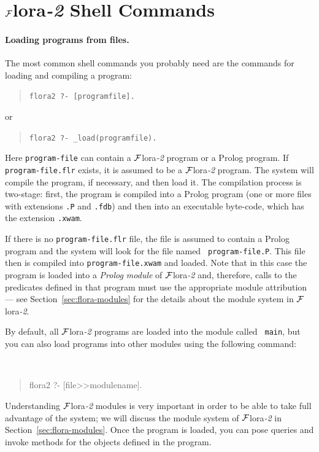 \documentclass[11pt]{article}
\newcommand{\FLORA}{{\mbox{\sc ${\cal F}${lora}\rm\emph{-2}}}\xspace}
\newcommand{\ofile}{xwam}
\begin{document}
\section{\FLORA Shell Commands} \label{sec-shell-commands}

\paragraph{Loading programs from files.}
The most common shell commands you probably need are the commands for
loading and compiling a program:
\begin{quote}
  {\tt flora2 ?-  [programfile].}
\end{quote}
or 
\begin{quote}
  {\tt flora2 ?- \_load(programfile).}
\end{quote}
Here {\tt program-file} can contain a \FLORA program or a Prolog program. If
{\tt program-file.flr} exists, it is assumed to be a \FLORA program. The
system will compile the program, if necessary, and then load it. The
compilation process is two-stage: first, the program is compiled into a
Prolog program (one or more files with extensions {\tt .P} and {\tt .fdb})
and then into an executable byte-code, which has the extension {\tt .\ofile}.

If there is no {\tt program-file.flr} file, the file is assumed to contain
a Prolog program and the system will look for the file named {\tt
  program-file.P}. This file then is compiled into {\tt program-file.\ofile} and
loaded. Note that in this case the program is loaded into a {\em Prolog
  module} of \FLORA and, therefore, calls to the predicates defined in that
program must use the appropriate module attribution --- see
Section~\ref{sec:flora-modules} for the details about the module system in
\FLORA.

By default, all \FLORA programs are loaded into the module called {\tt
  main}, but you can also load programs into other modules using the following
command:
{\tt
\begin{quote}
 flora2 ?-  [file>>modulename].
\end{quote}
}
Understanding \FLORA modules is very important in order to be able to take
full advantage of the system; we will discuss the module system of \FLORA
in Section~\ref{sec:flora-modules}.  Once the program is loaded, you can
pose queries and invoke methods for the objects defined in the program.
\end{document}
